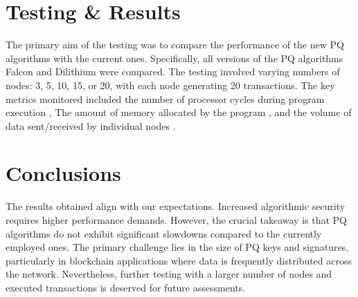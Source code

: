 \documentclass{ExcelAtFIT}
\begin{document}
\section{Testing \& Results}
\label{sec:Results}

The primary aim of the testing was to compare the performance of the new PQ algorithms with the current ones. Specifically, all versions of the PQ algorithms Falcon and Dilithium were compared. The testing involved varying numbers of nodes: 3, 5, 10, 15, or 20, with each node generating 20 transactions. The key metrics monitored included the number of processor cycles during program execution , The amount of memory allocated by the program , and the volume of data sent/received by individual nodes .

\section{Conclusions}
\label{sec:Conclusions}

The results obtained align with our expectations. Increased algorithmic security requires higher performance demands. However, the crucial takeaway is that PQ algorithms do not exhibit significant slowdowns compared to the currently employed ones. The primary challenge lies in the size of PQ keys and signatures, particularly in blockchain applications where data is frequently distributed across the network. Nevertheless, further testing with a larger number of nodes and executed transactions is deserved for future assessments.




\end{document}
